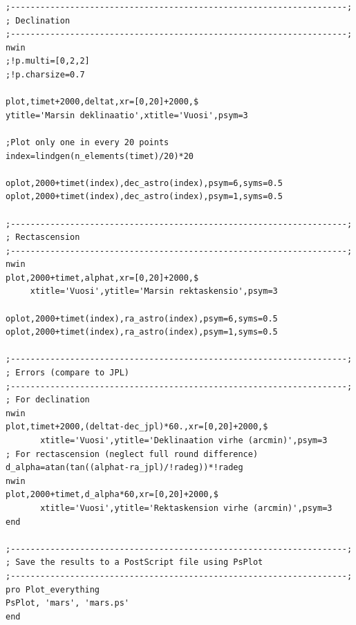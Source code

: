 \documentclass[12pt, a4paper]{article}
\begin{document}
\begin{scriptsize}
\begin{verbatim}
;--------------------------------------------------------------------;
; Declination
;--------------------------------------------------------------------;
nwin
;!p.multi=[0,2,2]
;!p.charsize=0.7

plot,timet+2000,deltat,xr=[0,20]+2000,$
ytitle='Marsin deklinaatio',xtitle='Vuosi',psym=3

;Plot only one in every 20 points
index=lindgen(n_elements(timet)/20)*20

oplot,2000+timet(index),dec_astro(index),psym=6,syms=0.5
oplot,2000+timet(index),dec_astro(index),psym=1,syms=0.5

;--------------------------------------------------------------------;
; Rectascension
;--------------------------------------------------------------------;
nwin
plot,2000+timet,alphat,xr=[0,20]+2000,$
     xtitle='Vuosi',ytitle='Marsin rektaskensio',psym=3
  
oplot,2000+timet(index),ra_astro(index),psym=6,syms=0.5
oplot,2000+timet(index),ra_astro(index),psym=1,syms=0.5

;--------------------------------------------------------------------;
; Errors (compare to JPL)
;--------------------------------------------------------------------;
; For declination
nwin
plot,timet+2000,(deltat-dec_jpl)*60.,xr=[0,20]+2000,$
       xtitle='Vuosi',ytitle='Deklinaation virhe (arcmin)',psym=3
; For rectascension (neglect full round difference)
d_alpha=atan(tan((alphat-ra_jpl)/!radeg))*!radeg
nwin
plot,2000+timet,d_alpha*60,xr=[0,20]+2000,$
       xtitle='Vuosi',ytitle='Rektaskension virhe (arcmin)',psym=3
end

;--------------------------------------------------------------------;
; Save the results to a PostScript file using PsPlot
;--------------------------------------------------------------------;
pro Plot_everything
PsPlot, 'mars', 'mars.ps'
end

\end{verbatim}
\end{scriptsize}
\end{document}
